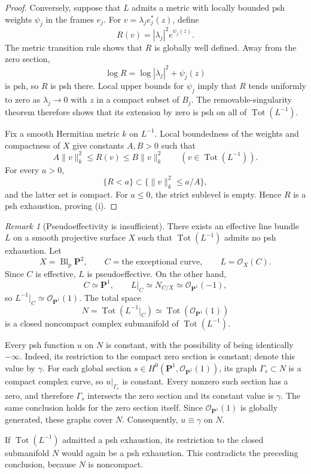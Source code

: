 \documentclass[11pt]{amsart}
\theoremstyle{definition}
\theoremstyle{remark}
\newtheorem{remark}{Remark}[section]
\numberwithin{equation}{section}
\newcommand{\PP}{\mathbf P}
\newcommand{\OO}{\mathcal O}
\newcommand{\Tot}{\operatorname{Tot}}
\newcommand{\Bl}{\operatorname{Bl}}
\begin{document}
\begin{proof}
Conversely, suppose that $L$ admits a metric with locally
bounded psh weights $\psi_j$ in the frames $e_j$. For
$v=\lambda_j e_j^*(z)$, define
\[
 R(v)=|\lambda_j|^2e^{\psi_j(z)}.
\]
The metric transition rule shows that $R$ is globally
well defined. Away from the zero section,
\[
 \log R=\log|\lambda_j|^2+\psi_j(z)
\]
is psh, so $R$ is psh there. Local upper bounds for $\psi_j$
imply that $R$ tends uniformly to zero as $\lambda_j\to0$
with $z$ in a compact subset of $B_j$. The
removable-singularity theorem therefore shows that its
extension by zero is psh on all of $\Tot(L^{-1})$.

Fix a smooth Hermitian metric $k$ on $L^{-1}$. Local
boundedness of the weights and compactness of $X$ give
constants $A,B>0$ such that
\[
 A\|v\|_k^2\le R(v)\le B\|v\|_k^2
 \qquad(v\in\Tot(L^{-1})).
\]
For every $a>0$,
\[
 \{R<a\}\subset\{\|v\|_k^2\le a/A\},
\]
and the latter set is compact. For $a\le0$, the strict
sublevel is empty. Hence $R$ is a psh exhaustion,
proving \textup{(i)}.
\end{proof}

\begin{remark}[Pseudoeffectivity is insufficient]
\label{prop:psef-counterexample}
There exists an effective line bundle $L$ on a smooth
projective surface $X$ such that $\Tot(L^{-1})$ admits
no psh exhaustion. Let
\[
 X=\Bl_p\PP^2,\qquad
 C=\text{the exceptional curve},\qquad L=\OO_X(C).
\]
Since $C$ is effective, $L$ is pseudoeffective. On the
other hand,
\[
 C\simeq\PP^1,\qquad
 L|_C\simeq N_{C/X}\simeq\OO_{\PP^1}(-1),
\]
so $L^{-1}|_C\simeq\OO_{\PP^1}(1)$. The total space
\[
 N=\Tot(L^{-1}|_C)\simeq\Tot(\OO_{\PP^1}(1))
\]
is a closed noncompact complex submanifold of $\Tot(L^{-1})$.

Every psh function $u$ on $N$ is constant, with the possibility
of being identically $-\infty$. Indeed, its restriction to
the compact zero section is constant; denote this value by
$\gamma$. For each global section
$s\in H^0(\PP^1,\OO_{\PP^1}(1))$, its graph
$\Gamma_s\subset N$ is a compact complex curve, so
$u|_{\Gamma_s}$ is constant. Every nonzero such section
has a zero, and therefore $\Gamma_s$ intersects the zero
section and its constant value is $\gamma$. The same
conclusion holds for the zero section itself. Since
$\OO_{\PP^1}(1)$ is globally generated, these graphs cover
$N$. Consequently, $u\equiv\gamma$ on $N$.

If $\Tot(L^{-1})$ admitted a psh exhaustion, its restriction
to the closed submanifold $N$ would again be a psh
exhaustion. This contradicts the preceding conclusion,
because $N$ is noncompact.
\end{remark}
\end{document}
